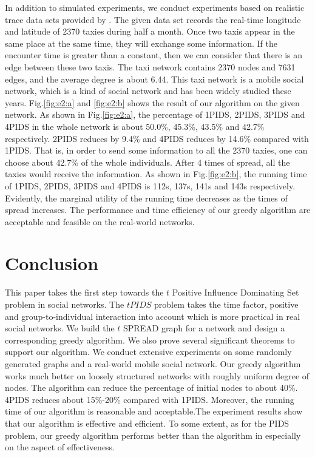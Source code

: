 In addition to simulated experiments, we conduct experiments based on realistic trace data sets provided by \cite{sju}. The given data set records the real-time longitude and latitude of 2370 taxies during half a month. Once two taxis appear in the same place at the same time, they will exchange some information. If the encounter time is greater than a constant, then we can consider that there is an edge between these two taxis. The taxi network contains 2370 nodes and 7631 edges, and the average degree is about 6.44. This taxi network is a mobile social network, which is a kind of social network and has been widely studied these years.  Fig.\ref{fig:e2:a} and \ref{fig:e2:b} shows the result of our algorithm on the given network.
As shown in Fig.\ref{fig:e2:a}, the percentage of 1PIDS, 2PIDS, 3PIDS and 4PIDS in the whole network is about 50.0\%, 45.3\%, 43.5\% and 42.7\% respectively. 2PIDS reduces by 9.4\% and 4PIDS reduces by 14.6\% compared with 1PIDS. That is, in order to send some information to all the 2370 taxies, one can choose about 42.7\% of the whole individuals. After 4 times of spread, all the taxies would receive the information. As shown in Fig.\ref{fig:e2:b}, the running time of 1PIDS, 2PIDS, 3PIDS and 4PIDS is 112s, 137s, 141s and 143s respectively. Evidently, the marginal utility of the running time decreases as the times of spread increases. The performance and time efficiency of our greedy algorithm are acceptable and feasible on the real-world networks.
\vspace{-0.65cm}
\section{Conclusion}
This paper takes the first step towards the $t$ Positive Influence Dominating Set problem in social networks.
The $tPIDS$ problem takes the time factor, positive and group-to-individual interaction into account which is more practical in real social networks.
We build the $t$ SPREAD graph for a network and design a corresponding greedy algorithm. We also prove several significant theorems to support our algorithm.
We conduct extensive experiments on some randomly generated graphs and a real-world mobile social network. Our greedy algorithm works much better on loosely structured networks with roughly uniform degree of nodes.
The algorithm can reduce the percentage of initial nodes to about 40\%. 4PIDS reduces about 15\%-20\% compared with 1PIDS. Moreover, the running time of our algorithm is reasonable and acceptable.The experiment results show that our algorithm is effective and efficient. To some extent, as for the PIDS problem, our greedy algorithm performs better than the algorithm in \cite{WDC2011} especially on the aspect of effectiveness.

